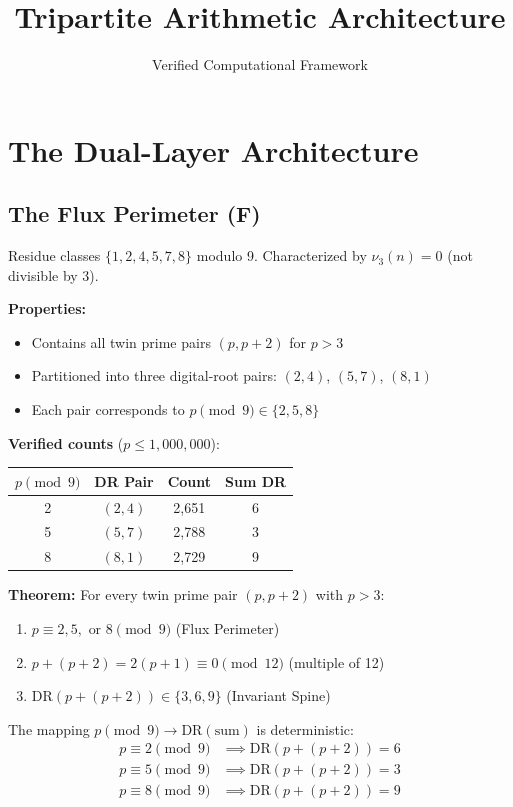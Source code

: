 \documentclass[11pt,a4paper]{article}
\title{\textbf{Tripartite Arithmetic Architecture}}
\author{Verified Computational Framework}
\date{}
\begin{document}
\maketitle

\section{The Dual-Layer Architecture}

\subsection{The Flux Perimeter ($\mathbf{F}$)}

Residue classes $\{1, 2, 4, 5, 7, 8\}$ modulo 9. Characterized by $\nu_3(n) = 0$ (not divisible by 3).

\textbf{Properties:}
\begin{itemize}
    \item Contains all twin prime pairs $(p, p+2)$ for $p > 3$
    \item Partitioned into three digital-root pairs: $(2,4)$, $(5,7)$, $(8,1)$
    \item Each pair corresponds to $p \pmod{9} \in \{2, 5, 8\}$
\end{itemize}

\textbf{Verified counts} ($p \leq 1{,}000{,}000$):
\begin{center}
\begin{tabular}{cccc}
\toprule
$p \pmod{9}$ & DR Pair & Count & Sum DR \\
\midrule
2 & $(2, 4)$ & 2{,}651 & 6 \\
5 & $(5, 7)$ & 2{,}788 & 3 \\
8 & $(8, 1)$ & 2{,}729 & 9 \\
\bottomrule
\end{tabular}
\end{center}

\textbf{Theorem:} For every twin prime pair $(p, p+2)$ with $p > 3$:
\begin{enumerate}
    \item $p \equiv 2, 5, \text{ or } 8 \pmod{9}$ (Flux Perimeter)
    \item $p + (p+2) = 2(p+1) \equiv 0 \pmod{12}$ (multiple of 12)
    \item $\text{DR}(p + (p+2)) \in \{3, 6, 9\}$ (Invariant Spine)
\end{enumerate}

The mapping $p \pmod{9} \to \text{DR}(\text{sum})$ is deterministic:
\begin{align}
p \equiv 2 \pmod{9} &\implies \text{DR}(p + (p+2)) = 6 \\
p \equiv 5 \pmod{9} &\implies \text{DR}(p + (p+2)) = 3 \\
p \equiv 8 \pmod{9} &\implies \text{DR}(p + (p+2)) = 9
\end{align}
\end{document}
